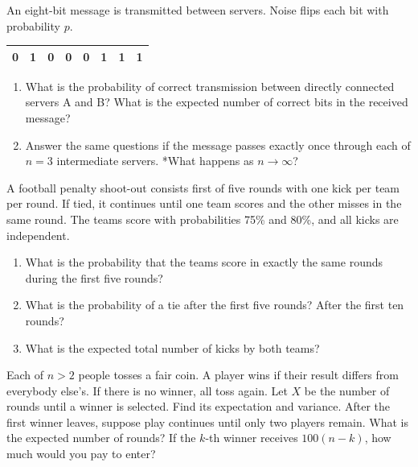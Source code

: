 \documentclass[a4paper]{report}
\begin{document}
\begin{problempencil}
An eight-bit message is transmitted between servers. Noise flips each bit with probability $p$.
\begin{center}\begin{tabular}{|c|c|c|c|c|c|c|c|}\hline 0&1&0&0&0&1&1&1\\\hline\end{tabular}\end{center}
\begin{enumerate}
\item What is the probability of correct transmission between directly connected servers A and B? What is the expected number of correct bits in the received message?
\item Answer the same questions if the message passes exactly once through each of $n=3$ intermediate servers. *What happens as $n\to\infty$?
\end{enumerate}
\end{problempencil}
\begin{problempencil}
A football penalty shoot-out consists first of five rounds with one kick per team per round. If tied, it continues until one team scores and the other misses in the same round. The teams score with probabilities 75\% and 80\%, and all kicks are independent.
\begin{enumerate}
\item What is the probability that the teams score in exactly the same rounds during the first five rounds?
\item What is the probability of a tie after the first five rounds? After the first ten rounds?
\item What is the expected total number of kicks by both teams?
\end{enumerate}
\end{problempencil}
\begin{problempencil}
Each of $n>2$ people tosses a fair coin. A player wins if their result differs from everybody else's. If there is no winner, all toss again. Let $X$ be the number of rounds until a winner is selected. Find its expectation and variance. After the first winner leaves, suppose play continues until only two players remain. What is the expected number of rounds? If the $k$-th winner receives $100(n-k)$, how much would you pay to enter?
\end{problempencil}
\end{document}

